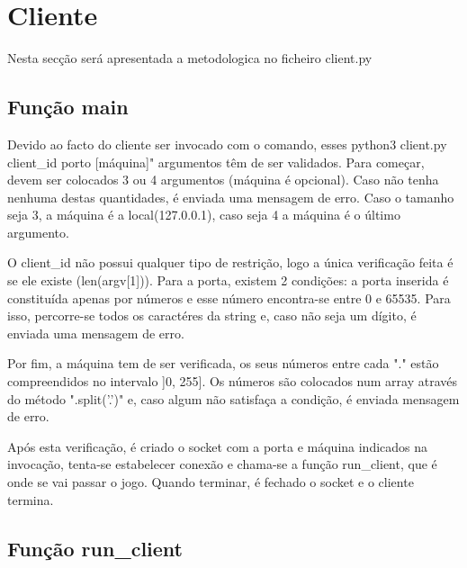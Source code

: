 \documentclass{report}
\begin{document}
\section{Cliente}
Nesta secção será apresentada a metodologica no ficheiro client.py

\subsection{Função main}
\label{ssec:main}
Devido ao facto do cliente ser invocado com o comando, esses python3 client.py client\_id porto [máquina]"
argumentos têm de ser validados. Para começar, devem ser colocados 3 ou 4 argumentos (máquina é opcional).
Caso não tenha nenhuma destas quantidades, é enviada uma mensagem de erro. Caso o tamanho seja 3, a máquina é
a local(127.0.0.1), caso seja 4 a máquina é o último argumento. 

O client\_id não possui qualquer tipo de restrição, 
logo a única verificação feita é se ele existe (len(argv[1])). Para a porta, existem 2 condições: a porta inserida é 
constituída apenas por números e esse número encontra-se entre 0 e 65535. Para isso, percorre-se todos os caractéres 
da string e, caso não seja um dígito, é enviada uma mensagem de erro.

Por fim, a máquina tem de ser verificada,
os seus números entre cada "." estão compreendidos no intervalo ]0, 255]. Os números são colocados num array através
do método ".split('.')" e, caso algum não satisfaça a condição, é enviada mensagem de erro.

Após esta verificação, é criado o socket com a porta e máquina indicados na invocação, tenta-se estabelecer conexão e chama-se a 
função run\_client, que é onde se vai passar o jogo. Quando terminar, é fechado o socket e o cliente termina.


\subsection{Função run\_client}
\end{document}
